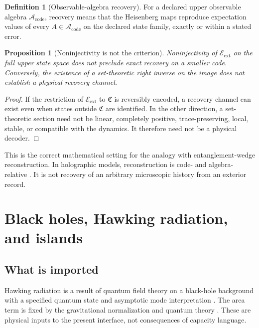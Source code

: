 \documentclass[11pt,a4paper]{article}
\numberwithin{equation}{section}
\newtheorem{proposition}[theorem]{Proposition}
\theoremstyle{definition}
\newtheorem{definition}[theorem]{Definition}
\theoremstyle{remark}
\newcommand{\cA}{\mathcal A}
\newcommand{\cE}{\mathcal E}
\begin{document}
\begin{definition}[Observable-algebra recovery]
For a declared upper observable algebra \(\cA_{\mathrm{code}}\), recovery
means that the Heisenberg maps reproduce expectation values of every
\(A\in\cA_{\mathrm{code}}\) on the declared state family, exactly or
within a stated error.
\end{definition}

\begin{proposition}[Noninjectivity is not the criterion]
Noninjectivity of \(\cE_{\mathrm{ext}}\) on the full upper state space
does not preclude exact recovery on a smaller code.  Conversely, the
existence of a set-theoretic right inverse on the image does not establish
a physical recovery channel.
\end{proposition}

\begin{proof}
If the restriction of \(\cE_{\mathrm{ext}}\) to
\(\mathfrak C\) is reversibly encoded, a recovery channel can exist even
when states outside \(\mathfrak C\) are identified.  In the other
direction, a set-theoretic section need not be linear, completely
positive, trace-preserving, local, stable, or compatible with the
dynamics.  It therefore need not be a physical decoder.
\end{proof}

This is the correct mathematical setting for the analogy with
entanglement-wedge reconstruction.  In holographic models, reconstruction
is code- and algebra-relative
\cite{AlmheiriDongHarlow2015,DongHarlowWall2016}.  It is not recovery of
an arbitrary microscopic history from an exterior record.

\section{Black holes, Hawking radiation, and islands}

\subsection{What is imported}

Hawking radiation is a result of quantum field theory on a black-hole
background with a specified quantum state and asymptotic mode
interpretation \cite{Hawking1975}.  The area term is fixed by the
gravitational normalization and quantum theory
\cite{Bekenstein1973,GibbonsHawking1977,Wald1993}.  These are physical
inputs to the present interface, not consequences of capacity language.
\end{document}
